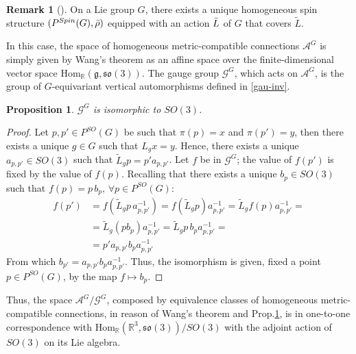 \documentclass{article}
\numberwithin{equation}{section}
\newtheorem{proposition}{Proposition}[section]
\theoremstyle{definition}
\newtheorem*{remark}{Remark}
\newcommand{\R}{\mathbb{R}}
\newcommand{\g}{\mathfrak{g}}
\newcommand{\A}{\mathcal{A}}
\newcommand{\so}[1]{\mathfrak{so}(#1)}
\newcommand{\OF}[1]{P^{SO}(#1)}
\newcommand{\SP}[1]{P^{Spin}(#1)}
\begin{document}
\begin{remark}[\cite{Lawn_2022}]
    On a Lie group $G$, there exists a unique homogeneous spin structure $(\SP{G},\Bar{\rho})$ equipped with an action $\Bar{L}$ of $G$ that covers $\tilde{L}$.
\end{remark}
In this case, the space of homogeneous metric-compatible connections $\A^G$ is simply given by Wang's theorem as an affine space over the finite-dimensional vector space $\mathrm{Hom}_{\R}(\g,\so{3})$. 
The gauge group $\mathcal{G}^G$, which acts on $\A^G$, is the group of $G$-equivariant vertical automorphisms defined in \eqref{gau-inv}.
\begin{proposition}
\label{gaugehom}
    $\mathcal{G}^G$ is isomorphic to $SO(3)$.
\end{proposition}
\begin{proof}
    Let $p,p'\in\OF{G}$ be such that $\pi(p)=x$ and $\pi(p')=y$, then there exists a unique $g\in G$ such that $L_g x=y$. Hence, there exists a unique $a_{p,p'}\in SO(3)$ such that $\tilde{L}_gp=p'a_{p,p'}$. Let $f$ be in $\mathcal{G}^G$; the value of $f(p')$ is fixed by the value of $f(p)$. Recalling that there exists a unique $b_p\in SO(3)$ such that $f(p)=p\,b_p,\,\forall p\in\OF{G}$:
    \begin{equation}
        \begin{split}
        f(p')&=f(\tilde{L}_gp\,a^{-1}_{p,p'})=f(\tilde{L}_gp)a^{-1}_{p,p'}=\tilde{L}_gf(p)a^{-1}_{p,p'}=\\
        &=\tilde{L}_g(pb_p)a^{-1}_{p,p'}=\tilde{L}_gp\,b_pa^{-1}_{p,p'}=\\
        &=p'a_{p,p'}b_pa^{-1}_{p,p'}
        \end{split}
    \end{equation}
    From which $b_{p'}=a_{p,p'}b_pa^{-1}_{p,p'}$. Thus, the isomorphism is given, fixed a point $p\in\OF{G}$, by the map $f\mapsto b_p$.
\end{proof}
Thus, the space $\A^G/\mathcal{G}^G$, composed by equivalence classes of homogeneous metric-compatible connections, in reason of Wang's theorem and Prop.\ref{gaugehom}, is in one-to-one correspondence with $\mathrm{Hom}_{\R}(\R^3,\so{3})/SO(3)$ with the adjoint action of $SO(3)$ on its Lie algebra.

\medskip
\end{document}
